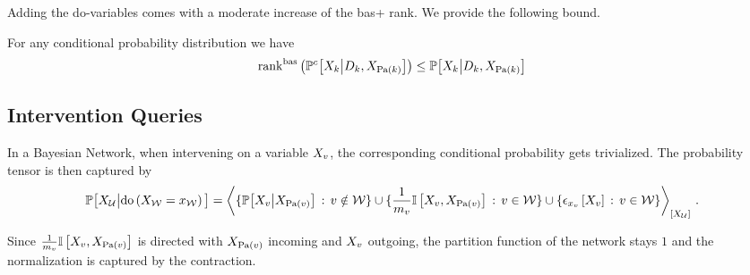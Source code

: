 Adding the do-variables comes with a moderate increase of the bas+ rank.
We provide the following bound.

\begin{lemma}
    For any conditional probability distribution we have
    \begin{align*}
        \mathrm{rank}^{\mathrm{bas}}\left(\mathbb{P}^{c}\big[X_{k}\big|D_{k},X_{\mathrm{Pa}(k)}\big]\right)
        \leq \mathbb{P}\big[X_{k}\big|D_{k},X_{\mathrm{Pa}(k)}\big]
    \end{align*}
\end{lemma}




\subsection{Intervention Queries}

In a Bayesian Network, when intervening on a variable $X_{v}$, the corresponding conditional probability gets trivialized.
The probability tensor is then captured by
\begin{align*}
    \mathbb{P}\big[X_{\mathcal{U}}\big|\mathrm{do}\left(X_{\mathcal{W}}=x_{\mathcal{W}}\right)\big]
    = \left\langle 
        \{\mathbb{P}\big[X_{v}\big|X_{\mathrm{Pa}(v)}\big] \,:\, v\notin\mathcal{W} \}
        \cup \{\frac{1}{m_{v}} \mathbb{I}\left[X_{v},X_{\mathrm{Pa}(v)}\right] \,:\, v\in\mathcal{W}\}
        \cup \{\epsilon_{x_{v}}\left[X_{v}\right] \,:\, v\in\mathcal{W}\}
    \right\rangle_{\left[ X_{\mathcal{U}} \right]} \, .
\end{align*}

Since $\frac{1}{m_{v}} \mathbb{I}\left[X_{v},X_{\mathrm{Pa}(v)}\right]$ is directed with $X_{\mathrm{Pa}(v)}$ incoming and $X_{v}$ outgoing, the partition function of the network stays $1$ and the normalization is captured by the contraction.

%
%

